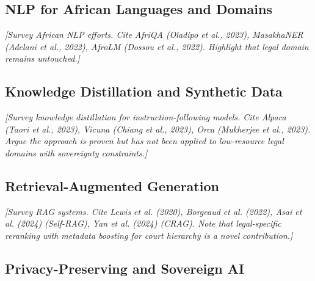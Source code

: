 \documentclass[11pt]{article}
\begin{document}
\subsection{NLP for African Languages and Domains}


\textit{[Survey African NLP efforts. Cite AfriQA (Oladipo et al., 2023),
MasakhaNER (Adelani et al., 2022), AfroLM (Dossou et al., 2022).
Highlight that legal domain remains untouched.]}


\subsection{Knowledge Distillation and Synthetic Data}


\textit{[Survey knowledge distillation for instruction-following models.
Cite Alpaca (Taori et al., 2023), Vicuna (Chiang et al., 2023),
Orca (Mukherjee et al., 2023). Argue the approach is proven but has
not been applied to low-resource legal domains with sovereignty
constraints.]}


\subsection{Retrieval-Augmented Generation}


\textit{[Survey RAG systems. Cite Lewis et al. (2020), Borgeaud et al.
(2022), Asai et al. (2024) (Self-RAG), Yan et al. (2024) (CRAG).
Note that legal-specific reranking with metadata boosting for court
hierarchy is a novel contribution.]}


\subsection{Privacy-Preserving and Sovereign AI}

\end{document}

